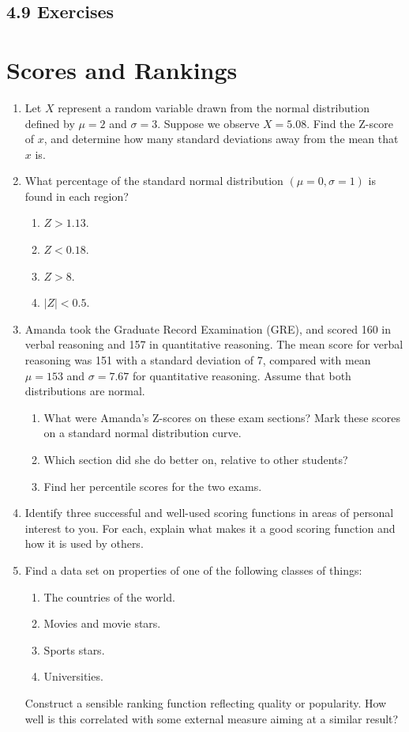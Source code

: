 \documentclass[10pt]{article}
\begin{document}
\subsection*{4.9 Exercises}
\section*{Scores and Rankings}
\begin{enumerate}
    \item Let $X$ represent a random variable drawn from the normal distribution defined by $\mu=2$ and $\sigma=3$. Suppose we observe $X=5.08$. Find the Z-score of $x$, and determine how many standard deviations away from the mean that $x$ is.
    
    \item What percentage of the standard normal distribution $(\mu=0, \sigma=1)$ is found in each region?
    \begin{enumerate}
        \item $Z > 1.13$.
        \item $Z < 0.18$.
        \item $Z > 8$.
        \item $|Z| < 0.5$.
    \end{enumerate}
    
    \item Amanda took the Graduate Record Examination (GRE), and scored 160 in verbal reasoning and 157 in quantitative reasoning. The mean score for verbal reasoning was 151 with a standard deviation of 7, compared with mean $\mu=153$ and $\sigma=7.67$ for quantitative reasoning. Assume that both distributions are normal.
    \begin{enumerate}
        \item What were Amanda's Z-scores on these exam sections? Mark these scores on a standard normal distribution curve.
        \item Which section did she do better on, relative to other students?
        \item Find her percentile scores for the two exams.
    \end{enumerate}
    
    \item Identify three successful and well-used scoring functions in areas of personal interest to you. For each, explain what makes it a good scoring function and how it is used by others.
    
    \item Find a data set on properties of one of the following classes of things:
    \begin{enumerate}
        \item The countries of the world.
        \item Movies and movie stars.
        \item Sports stars.
        \item Universities.
    \end{enumerate}
    Construct a sensible ranking function reflecting quality or popularity. How well is this correlated with some external measure aiming at a similar result?
    

\end{enumerate}
\end{document}
